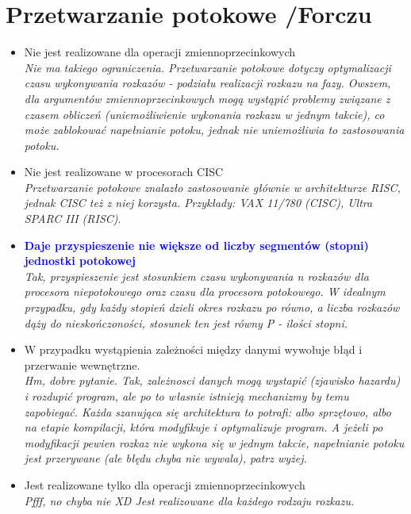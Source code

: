 \documentclass[a4paper,twoside]{article}
\begin{document}
\section{Przetwarzanie potokowe {\small /Forczu}}
	\begin{itemize}
    \item Nie jest realizowane dla operacji zmiennoprzecinkowych\\
    {\small \emph{Nie ma takiego ograniczenia. Przetwarzanie potokowe dotyczy optymalizacji czasu wykonywania rozkazów - podziału realizacji rozkazu na fazy. Owszem, dla argumentów zmiennoprzecinkowych mogą wystąpić problemy związane z czasem obliczeń (uniemożliwienie wykonania rozkazu w jednym takcie), co może zablokować napełnianie potoku, jednak nie uniemożliwia to zastosowania potoku.}}
    \item Nie jest realizowane w procesorach CISC\\
    {\small \emph{Przetwarzanie potokowe znalazło zastosowanie głównie w architekturze RISC, jednak CISC też z niej korzysta. Przykłady: VAX 11/780 (CISC), Ultra SPARC III (RISC)}.}
    \item \textcolor{Blue}{\textbf{Daje przyspieszenie nie większe od liczby segmentów (stopni) jednostki potokowej}}\\
    {\small \emph{Tak, przyspieszenie jest stosunkiem czasu wykonywania \emph{n} rozkazów dla procesora niepotokowego oraz czasu dla procesora potokowego. W idealnym przypadku, gdy każdy stopień dzieli okres rozkazu po równo, a liczba rozkazów dąży do nieskończoności, stosunek ten jest równy P - ilości stopni.}}
    \item W przypadku wystąpienia zależności między danymi wywołuje błąd i przerwanie wewnętrzne.\\
    {\small \emph{Hm, dobre pytanie. Tak, zależnosci danych mogą wystapić (zjawisko hazardu) i rozdupić program, ale po to własnie istnieją mechanizmy by temu zapobiegać. Każda szanująca się architektura to potrafi: albo sprzętowo, albo na etapie kompilacji, która modyfikuje i optymalizuje program. A jeżeli po modyfikacji pewien rozkaz nie wykona się w jednym takcie, napełnianie potoku jest przerywane (ale błędu chyba nie wywala), patrz wyżej.}}
    \item Jest realizowane tylko dla operacji zmiennoprzecinkowych\\
    {\small \emph{Pfff, no chyba nie XD Jest realizowane dla każdego rodzaju rozkazu.}}
    \end{itemize}
\end{document}
